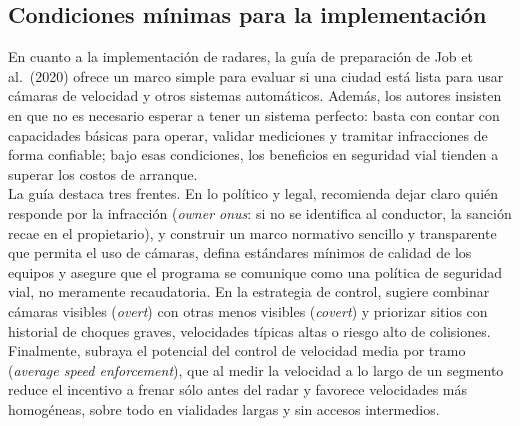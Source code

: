 \subsection{Condiciones mínimas para la implementación}

\noindent En cuanto a la implementación de radares, la guía de preparación de Job et al.\ (2020) ofrece un marco simple para evaluar si una ciudad está lista para usar cámaras de velocidad y otros sistemas automáticos. Además, los autores insisten en que no es necesario esperar a tener un sistema perfecto: basta con contar con capacidades básicas para operar, validar mediciones y tramitar infracciones de forma confiable; bajo esas condiciones, los beneficios en seguridad vial tienden a superar los costos de arranque.\\

La guía destaca tres frentes. En lo político y legal, recomienda dejar claro quién responde por la infracción (\emph{owner onus}: si no se identifica al conductor, la sanción recae en el propietario), y construir un marco normativo sencillo y transparente que permita el uso de cámaras, defina estándares mínimos de calidad de los equipos y asegure que el programa se comunique como una política de seguridad vial, no meramente recaudatoria. En la estrategia de control, sugiere combinar cámaras visibles (\emph{overt}) con otras menos visibles (\emph{covert}) y priorizar sitios con historial de choques graves, velocidades típicas altas o riesgo alto de colisiones. Finalmente, subraya el potencial del control de velocidad media por tramo (\emph{average speed enforcement}), que al medir la velocidad a lo largo de un segmento reduce el incentivo a frenar sólo antes del radar y favorece velocidades más homogéneas, sobre todo en vialidades largas y sin accesos intermedios.\\
